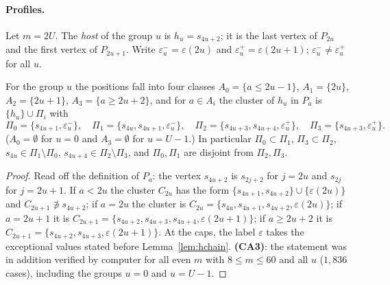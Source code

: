 \paragraph{Profiles.} Let $m=2U$. The \emph{host} of the group $u$ is $h_u=s_{4u+2}$; it is the last vertex of $P_{2u}$ and the first vertex of $P_{2u+1}$. Write $\varepsilon^-_u=\varepsilon(2u)$ and $\varepsilon^+_u=\varepsilon(2u+1)$; $\varepsilon^-_u\ne\varepsilon^+_u$ for all $u$.
\begin{lemma}\label{lem:hprof}
For the group $u$ the positions fall into four classes $A_0=\{a\le2u-1\}$, $A_1=\{2u\}$, $A_2=\{2u+1\}$, $A_3=\{a\ge 2u+2\}$, and for $a\in A_i$ the cluster of $h_u$ in $P_a$ is $\{h_u\}\cup\Pi_i$ with
\[
\Pi_0=\{s_{4u+1},\varepsilon^-_u\},\quad \Pi_1=\{s_{4u},s_{4u+1},\varepsilon^-_u\},\quad \Pi_2=\{s_{4u+3},s_{4u+4},\varepsilon^+_u\},\quad \Pi_3=\{s_{4u+3},\varepsilon^+_u\}.
\]
($A_0=\emptyset$ for $u=0$ and $A_3=\emptyset$ for $u=U-1$.) In particular $\Pi_0\subset\Pi_1$, $\Pi_3\subset\Pi_2$, $s_{4u}\in\Pi_1\setminus\Pi_0$, $s_{4u+4}\in\Pi_2\setminus\Pi_3$, and $\Pi_0,\Pi_1$ are disjoint from $\Pi_2,\Pi_3$.
\end{lemma}
\begin{proof}
Read off the definition of $P_a$: the vertex $s_{4u+2}$ is $s_{2j+2}$ for $j=2u$ and $s_{2j}$ for $j=2u+1$. If $a<2u$ the cluster $C_{2u}$ has the form $\{s_{4u+1},s_{4u+2}\}\cup\{\varepsilon(2u)\}$ and $C_{2u+1}\not\ni s_{4u+2}$; if $a=2u$ the cluster is $C_{2u}=\{s_{4u},s_{4u+1},s_{4u+2},\varepsilon(2u)\}$; if $a=2u+1$ it is $C_{2u+1}=\{s_{4u+2},s_{4u+3},s_{4u+4},\varepsilon(2u+1)\}$; if $a\ge2u+2$ it is $C_{2u+1}=\{s_{4u+2},s_{4u+3},\varepsilon(2u+1)\}$. At the caps, the label $\varepsilon$ takes the exceptional values stated before Lemma~\ref{lem:hchain}. \textbf{(CA3)}: the statement was in addition verified by computer for all even $m$ with $8\le m\le60$ and all $u$ ($1{,}836$ cases), including the groups $u=0$ and $u=U-1$.
\end{proof}
